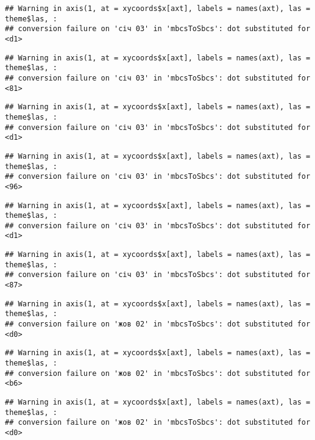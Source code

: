 \documentclass[]{article}
\begin{document}
\begin{verbatim}
## Warning in axis(1, at = xycoords$x[axt], labels = names(axt), las = theme$las, :
## conversion failure on 'січ 03' in 'mbcsToSbcs': dot substituted for <d1>
\end{verbatim}

\begin{verbatim}
## Warning in axis(1, at = xycoords$x[axt], labels = names(axt), las = theme$las, :
## conversion failure on 'січ 03' in 'mbcsToSbcs': dot substituted for <81>
\end{verbatim}

\begin{verbatim}
## Warning in axis(1, at = xycoords$x[axt], labels = names(axt), las = theme$las, :
## conversion failure on 'січ 03' in 'mbcsToSbcs': dot substituted for <d1>
\end{verbatim}

\begin{verbatim}
## Warning in axis(1, at = xycoords$x[axt], labels = names(axt), las = theme$las, :
## conversion failure on 'січ 03' in 'mbcsToSbcs': dot substituted for <96>
\end{verbatim}

\begin{verbatim}
## Warning in axis(1, at = xycoords$x[axt], labels = names(axt), las = theme$las, :
## conversion failure on 'січ 03' in 'mbcsToSbcs': dot substituted for <d1>
\end{verbatim}

\begin{verbatim}
## Warning in axis(1, at = xycoords$x[axt], labels = names(axt), las = theme$las, :
## conversion failure on 'січ 03' in 'mbcsToSbcs': dot substituted for <87>
\end{verbatim}

\begin{verbatim}
## Warning in axis(1, at = xycoords$x[axt], labels = names(axt), las = theme$las, :
## conversion failure on 'жов 02' in 'mbcsToSbcs': dot substituted for <d0>
\end{verbatim}

\begin{verbatim}
## Warning in axis(1, at = xycoords$x[axt], labels = names(axt), las = theme$las, :
## conversion failure on 'жов 02' in 'mbcsToSbcs': dot substituted for <b6>
\end{verbatim}

\begin{verbatim}
## Warning in axis(1, at = xycoords$x[axt], labels = names(axt), las = theme$las, :
## conversion failure on 'жов 02' in 'mbcsToSbcs': dot substituted for <d0>
\end{verbatim}
\end{document}
